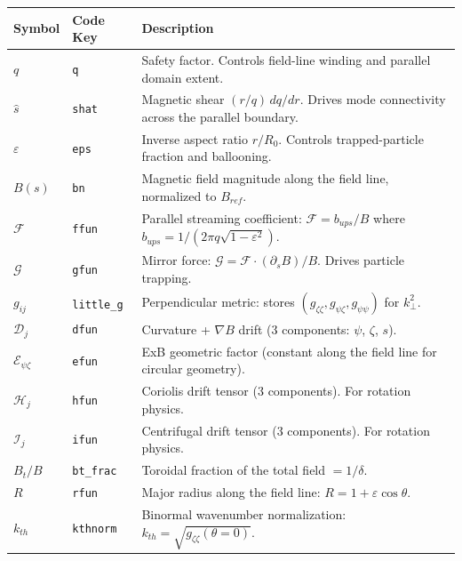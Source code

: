 \documentclass{article}
\theoremstyle{plain}
\theoremstyle{definition}
\theoremstyle{remark}
\begin{document}
\begin{longtable}{p{} p{} p{}}
\toprule
\textbf{Symbol} & \textbf{Code Key} & \textbf{Description} \\
\midrule
\endfirsthead
\midrule
\endhead
\bottomrule
\endfoot
$q$ & \texttt{q} & Safety factor. Controls field-line winding and parallel domain extent. \\
$\hat{s}$ & \texttt{shat} & Magnetic shear $(r/q)\,dq/dr$. Drives mode connectivity across the parallel boundary. \\
$\varepsilon$ & \texttt{eps} & Inverse aspect ratio $r/R_0$. Controls trapped-particle fraction and ballooning. \\
$B(s)$ & \texttt{bn} & Magnetic field magnitude along the field line, normalized to $B_{ref}$. \\
$\mathcal{F}$ & \texttt{ffun} & Parallel streaming coefficient: $\mathcal{F} = b_{ups}/B$ where $b_{ups} = 1/(2\pi q\sqrt{1-\varepsilon^2})$. \\
$\mathcal{G}$ & \texttt{gfun} & Mirror force: $\mathcal{G} = \mathcal{F} \cdot (\partial_s B)/B$. Drives particle trapping. \\
$g_{ij}$ & \texttt{little\_g} & Perpendicular metric: stores $(g_{\zeta\zeta}, g_{\psi\zeta}, g_{\psi\psi})$ for $k_\perp^2$. \\
$\mathcal{D}_j$ & \texttt{dfun} & Curvature + $\nabla B$ drift (3 components: $\psi$, $\zeta$, $s$). \\
$\mathcal{E}_{\psi\zeta}$ & \texttt{efun} & ExB geometric factor (constant along the field line for circular geometry). \\
$\mathcal{H}_j$ & \texttt{hfun} & Coriolis drift tensor (3 components). For rotation physics. \\
$\mathcal{I}_j$ & \texttt{ifun} & Centrifugal drift tensor (3 components). For rotation physics. \\
$B_t/B$ & \texttt{bt\_frac} & Toroidal fraction of the total field $= 1/\delta$. \\
$R$ & \texttt{rfun} & Major radius along the field line: $R = 1 + \varepsilon\cos\theta$. \\
$k_{th}$ & \texttt{kthnorm} & Binormal wavenumber normalization: $k_{th} = \sqrt{g_{\zeta\zeta}(\theta=0)}$. \\
\bottomrule
\end{longtable}
\end{document}
